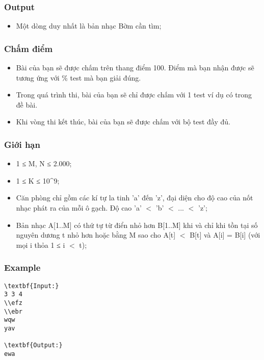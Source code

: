 \subsubsection{   Output  }
\begin{itemize}
	\item     Một dòng duy nhất là bản nhạc Bờm cần tìm;   
\end{itemize}

\subsubsection{   Chấm điểm  }
\begin{itemize}
	\item     Bài của bạn sẽ được chấm trên thang điểm 100. Điểm mà bạn nhận được sẽ tương ứng với \% test mà bạn giải đúng.   
	\item     Trong quá trình thi, bài của bạn sẽ chỉ được chấm với 1 test ví dụ có trong đề bài.   
	\item     Khi vòng thi kết thúc, bài của bạn sẽ được chấm với bộ test đầy đủ.   
\end{itemize}

\subsubsection{   Giới hạn  }
\begin{itemize}
	\item     1 ≤ M, N ≤ 2.000;   
	\item     1 ≤ K ≤ 10\textasciicircum9;   
	\item     Căn phòng chỉ gồm các kí tự la tinh 'a' đến 'z', đại diện cho độ cao của nốt nhạc phát ra của mỗi ô gạch. Độ cao 'a' $<$ 'b' $<$ ... $<$ 'z';   
	\item     Bản nhạc A[1..M] có thứ tự từ điển nhỏ hơn B[1..M] khi và chỉ khi tồn tại số nguyên dương t nhỏ hơn hoặc bằng M sao cho A[t] $<$ B[t] và A[i] = B[i] (với mọi i thỏa 1 ≤ i $<$ t);   
\end{itemize}
\begin{itemize}
\end{itemize}

\subsubsection{   Example  }
\begin{verbatim}
\textbf{Input:}
3 3 4
\\efz
\\ebr
wqw
yav

\textbf{Output:}
ewa
\end{verbatim}